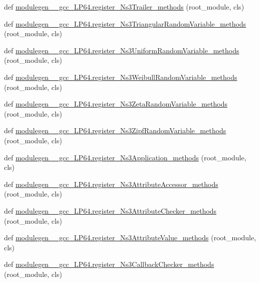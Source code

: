 \begin{DoxyCompactItemize}
\item 
def \hyperlink{namespacemodulegen____gcc__LP64_a79f6f84947747209adf07fee76a18188}{modulegen\+\_\+\+\_\+gcc\+\_\+\+L\+P64.\+register\+\_\+\+Ns3\+Trailer\+\_\+methods} (root\+\_\+module, cls)
\item 
def \hyperlink{namespacemodulegen____gcc__LP64_a164735782e09ede8e4cec78054019282}{modulegen\+\_\+\+\_\+gcc\+\_\+\+L\+P64.\+register\+\_\+\+Ns3\+Triangular\+Random\+Variable\+\_\+methods} (root\+\_\+module, cls)
\item 
def \hyperlink{namespacemodulegen____gcc__LP64_a4aa9337458c6bfbb16285c72600d2605}{modulegen\+\_\+\+\_\+gcc\+\_\+\+L\+P64.\+register\+\_\+\+Ns3\+Uniform\+Random\+Variable\+\_\+methods} (root\+\_\+module, cls)
\item 
def \hyperlink{namespacemodulegen____gcc__LP64_a77ea65e0aa1398f09b27adc28eec22cd}{modulegen\+\_\+\+\_\+gcc\+\_\+\+L\+P64.\+register\+\_\+\+Ns3\+Weibull\+Random\+Variable\+\_\+methods} (root\+\_\+module, cls)
\item 
def \hyperlink{namespacemodulegen____gcc__LP64_a0627de79307ebfed0def7640ef614931}{modulegen\+\_\+\+\_\+gcc\+\_\+\+L\+P64.\+register\+\_\+\+Ns3\+Zeta\+Random\+Variable\+\_\+methods} (root\+\_\+module, cls)
\item 
def \hyperlink{namespacemodulegen____gcc__LP64_ac906c1eb78170163bc3e2e3e65f8e43d}{modulegen\+\_\+\+\_\+gcc\+\_\+\+L\+P64.\+register\+\_\+\+Ns3\+Zipf\+Random\+Variable\+\_\+methods} (root\+\_\+module, cls)
\item 
def \hyperlink{namespacemodulegen____gcc__LP64_ae4ab0f18046d47b422da15b02e269d07}{modulegen\+\_\+\+\_\+gcc\+\_\+\+L\+P64.\+register\+\_\+\+Ns3\+Application\+\_\+methods} (root\+\_\+module, cls)
\item 
def \hyperlink{namespacemodulegen____gcc__LP64_a88b38d1f62a9078cdbfc0f0d77a01866}{modulegen\+\_\+\+\_\+gcc\+\_\+\+L\+P64.\+register\+\_\+\+Ns3\+Attribute\+Accessor\+\_\+methods} (root\+\_\+module, cls)
\item 
def \hyperlink{namespacemodulegen____gcc__LP64_a7a7d7cb7b6a065a93209b09c08d1c096}{modulegen\+\_\+\+\_\+gcc\+\_\+\+L\+P64.\+register\+\_\+\+Ns3\+Attribute\+Checker\+\_\+methods} (root\+\_\+module, cls)
\item 
def \hyperlink{namespacemodulegen____gcc__LP64_a91d88e3bac410892f68a8f1bfd117d79}{modulegen\+\_\+\+\_\+gcc\+\_\+\+L\+P64.\+register\+\_\+\+Ns3\+Attribute\+Value\+\_\+methods} (root\+\_\+module, cls)
\item 
def \hyperlink{namespacemodulegen____gcc__LP64_a1ef896a5bde844de40d219e98ceb0cee}{modulegen\+\_\+\+\_\+gcc\+\_\+\+L\+P64.\+register\+\_\+\+Ns3\+Callback\+Checker\+\_\+methods} (root\+\_\+module, cls)

\end{DoxyCompactItemize}

